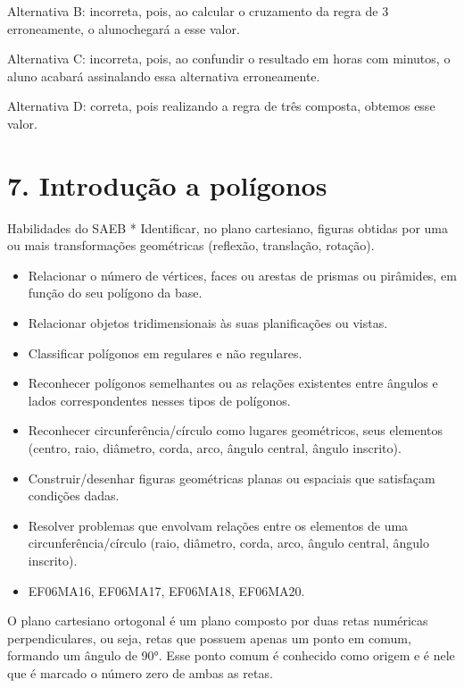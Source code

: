 Alternativa B: incorreta, pois, ao calcular o cruzamento da regra de 3
erroneamente, o alunochegará a esse valor.

Alternativa C: incorreta, pois, ao confundir o resultado em horas com
minutos, o aluno acabará assinalando essa alternativa erroneamente.

Alternativa D: correta, pois realizando a regra de três composta,
obtemos esse valor.

\chapter{7. Introdução a
polígonos}

Habilidades do SAEB * Identificar, no plano cartesiano, figuras obtidas
por uma ou mais transformações geométricas (reflexão, translação,
rotação).

\begin{itemize}
\item
  Relacionar o número de vértices, faces ou arestas de prismas ou
  pirâmides, em função do seu polígono da base.
\item
  Relacionar objetos tridimensionais às suas planificações ou vistas.
\item
  Classificar polígonos em regulares e não regulares.
\item
  Reconhecer polígonos semelhantes ou as relações existentes entre
  ângulos e lados correspondentes nesses tipos de polígonos.
\item
  Reconhecer circunferência/círculo como lugares geométricos, seus
  elementos (centro, raio, diâmetro, corda, arco, ângulo central, ângulo
  inscrito).
\item
  Construir/desenhar figuras geométricas planas ou espaciais que
  satisfaçam condições dadas.
\item
  Resolver problemas que envolvam relações entre os elementos de uma
  circunferência/círculo (raio, diâmetro, corda, arco, ângulo central,
  ângulo inscrito).
\end{itemize}


\begin{itemize} 
\item  EF06MA16, EF06MA17, EF06MA18, EF06MA20.
\end{itemize}

O plano cartesiano ortogonal é um plano composto por duas retas
numéricas perpendiculares, ou seja, retas que possuem apenas um ponto em
comum, formando um ângulo de 90°. Esse ponto comum é conhecido como
origem e é nele que é marcado o número zero de ambas as retas.

